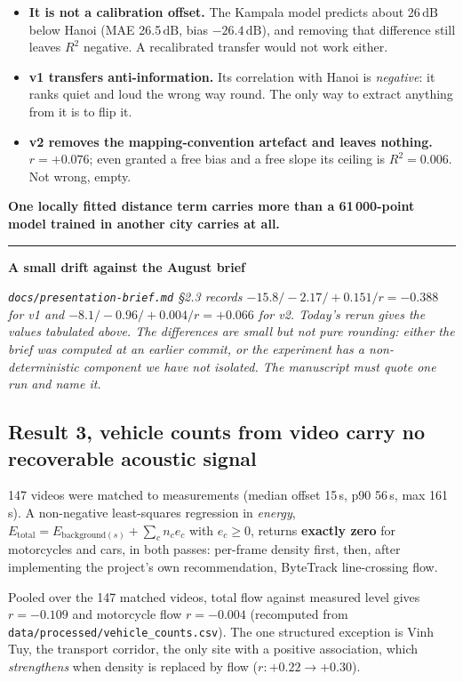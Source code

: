 \documentclass[11pt,a4paper]{article}
\newcommand{\dB}{\ensuremath{\,\mathrm{dB}}}
\newcommand{\pth}[1]{\texttt{\small #1}}
\newenvironment{caveat}[1]
 {\par\medskip\noindent\begin{minipage}{\linewidth}%
 \color{warnc}\rule{2pt}{\baselineskip}\hspace{.6em}\textbf{#1}\par\vspace{.2em}
 \hspace*{1.4em}\begin{minipage}{\dimexpr\linewidth-1.4em\relax}\small\itshape}
 {\end{minipage}\end{minipage}\par\medskip}
\begin{document}
\begin{itemize}
 \item \textbf{It is not a calibration offset.} The Kampala model predicts about
 26\dB{} below Hanoi (MAE 26.5\dB, bias $-26.4$\dB), and removing that
 difference still leaves $R^2$ negative. A recalibrated transfer would not
 work either.
 \item \textbf{v1 transfers anti-information.} Its correlation with Hanoi is
 \emph{negative}: it ranks quiet and loud the wrong way round. The only way
 to extract anything from it is to flip it.
 \item \textbf{v2 removes the mapping-convention artefact and leaves nothing.}
 $r = +0.076$; even granted a free bias and a free slope its ceiling is
 $R^2 = 0.006$. Not wrong, empty.
\end{itemize}

\noindent\textbf{One locally fitted distance term carries more than a
61\,000-point model trained in another city carries at all.}

\begin{caveat}{A small drift against the August brief}
\pth{docs/presentation-brief.md} §2.3 records $-15.8 / -2.17 / +0.151 / r=-0.388$
for v1 and $-8.1 / -0.96 / +0.004 / r=+0.066$ for v2. Today's rerun gives the
values tabulated above. The differences are small but not pure rounding: either
the brief was computed at an earlier commit, or the experiment has a
non-deterministic component we have not isolated. The manuscript must quote one
run and name it.
\end{caveat}

\subsection{Result 3, vehicle counts from video carry no recoverable acoustic signal}\label{sec:result3}

147 videos were matched to measurements (median offset 15\,s, p90 56\,s, max
161\,s). A non-negative least-squares regression in \emph{energy},
$E_{\text{total}} = E_{\text{background}(s)} + \sum_c n_c e_c$ with $e_c \ge 0$,
returns \textbf{exactly zero} for motorcycles and cars, in both passes:
per-frame density first, then, after implementing the project's own
recommendation, ByteTrack line-crossing flow.

Pooled over the 147 matched videos, total flow against measured level gives
$r = -0.109$ and motorcycle flow $r = -0.004$ (recomputed from
\pth{data/processed/vehicle\_counts.csv}). The one structured exception is Vinh
Tuy, the transport corridor, the only site with a positive association, which
\emph{strengthens} when density is replaced by flow ($r: +0.22 \to +0.30$).
\end{document}
